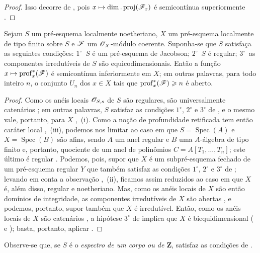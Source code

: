 \begin{proof}
Isso decorre de , pois $x\mapsto\dim.\operatorname{proj}(\sh{F}_x)$ é semicontínua superiormente .
\end{proof}

\begin{proposition}[10.8.5]
\label{IV.10.8.5}
Sejam $S$ um pré-esquema localmente noetheriano, $X$ um pré-esquema localmente de tipo finito sobre $S$ e $\mathscr{F}$ um $\mathscr{O}_X$-módulo coerente.
Suponha-se que $S$ satisfaça as seguintes condições: $1^\circ$~$S$ é um pré-esquema de Jacobson; $2^\circ$~$S$ é regular; $3^\circ$~as componentes irredutíveis de $S$ são equicodimensionais.
Então a função $x\mapsto\operatorname{prof}^{*}_{x}(\sh{F})$ é semicontínua inferiormente em $X$; em outras palavras, para todo inteiro $n$, o conjunto $U_n$ dos $x\in X$ tais que $\operatorname{prof}^{*}_{x}(\mathscr{F})\geqslant n$ é aberto.
\end{proposition}

\begin{proof}
Como os anéis locais $\mathscr{O}_{S,s}$ de $S$ são regulares, são universalmente catenários ; em outras palavras, $S$ satisfaz as condições $1^\circ$, $2^\circ$ e $3^\circ$ de , e o mesmo vale, portanto, para $X$ ,~(i).
Como a noção de profundidade retificada tem então caráter local ,~(iii), podemos nos limitar ao caso em que $S=\operatorname{Spec}(A)$ e $X=\operatorname{Spec}(B)$ são afins, sendo $A$ um anel regular e $B$ uma $A$-álgebra de tipo finito e, portanto, quociente de um anel de polinômios $C=A[T_1,\ldots,T_n]$; este último é regular .
Podemos, pois, supor que $X$ é um subpré-esquema fechado de um pré-esquema regular $Y$ que também satisfaz as condições $1^\circ$, $2^\circ$ e $3^\circ$ de ; levando em conta a observação ,~(ii), ficamos assim reduzidos ao caso em que $X$ é, além disso, regular e noetheriano.
Mas, como os anéis locais de $X$ são então domínios de integridade, as componentes irredutíveis de $X$ são
abertas , e podemos, portanto, supor também que $X$ é irredutível.
Então, como os anéis locais de $X$ são catenários , a hipótese $3^\circ$ de  implica que $X$ é biequidimensional ( e ); basta, portanto, aplicar .
\end{proof}

Observe-se que, se $S$ é o \emph{espectro de um corpo ou de $\mathbf{Z}$}, satisfaz as condições de .

